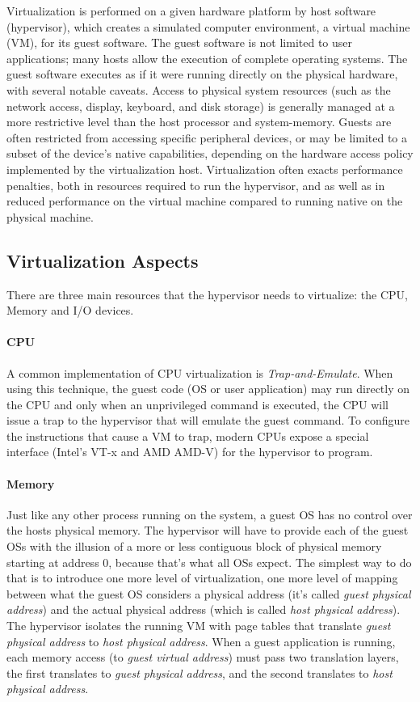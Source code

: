 Virtualization is performed on a given hardware platform by host software (hypervisor), which creates a
simulated computer environment, a virtual machine (VM), for its guest software.
The guest software is not limited to user applications; many hosts allow the execution of complete operating
systems. The guest software executes as if it were running directly on the physical hardware, with several
notable caveats. Access to physical system resources (such as the network access, display, keyboard, and disk
storage) is generally managed at a more restrictive level than the host processor and system-memory. Guests are
often restricted from accessing specific peripheral devices, or may be limited to a subset of the device's
native capabilities, depending on the hardware access policy implemented by the virtualization host.
Virtualization often exacts performance penalties, both in resources required to run the hypervisor,
and as well as in reduced performance on the virtual machine compared to running native on the physical machine.

\subsection*{Virtualization Aspects}
There are three main resources that the hypervisor needs to virtualize: the CPU, Memory and I/O devices.

\paragraph {CPU}
A common implementation of CPU virtualization is \emph{Trap-and-Emulate}. When using this technique,
the guest code (OS or user application) may run directly on the CPU and only when an unprivileged command is
executed, the CPU will issue a trap to the hypervisor that  will emulate the guest command. To configure the instructions that cause a VM to trap, modern CPUs expose a special interface (Intel's VT-x and AMD AMD-V) for the hypervisor to program.


\paragraph {Memory}
Just like any other process running on the system, a guest OS has no control over the hosts physical memory.
The hypervisor will have to provide each of the guest OSs with the illusion of a more or less contiguous block of physical memory starting at address 0, because that's what all OSs expect.
%
The simplest way to do that is to introduce one more level of virtualization, one more  level of mapping between what the guest OS considers a physical address (it's called \emph{guest physical address}) and the actual physical address (which is called \emph{host physical address}).
The hypervisor isolates the running VM with page tables that translate \emph{guest physical address} to \emph{host physical address}. When a guest application is running, each memory access (to \emph{guest virtual address}) must pass two translation layers, the first translates to \emph{guest physical address}, and the second translates to \emph{host physical address}.

